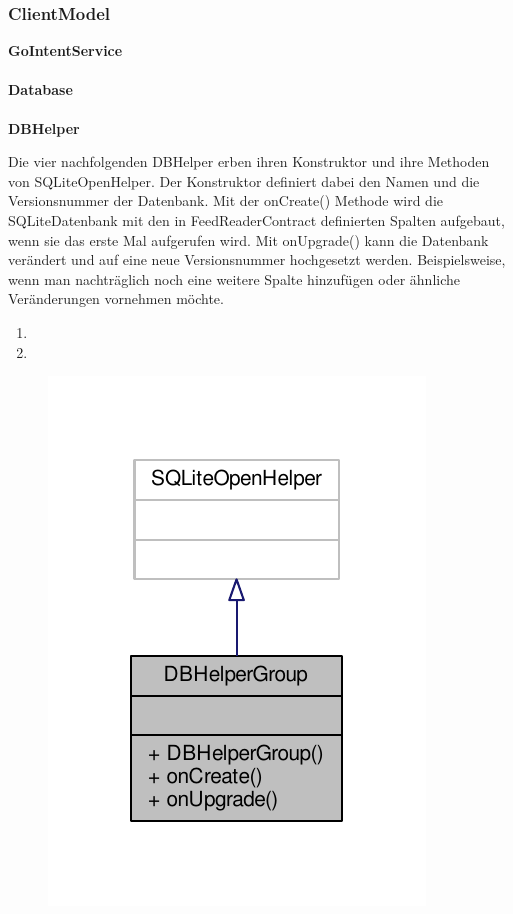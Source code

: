\subsubsection{ClientModel}

\textbf{GoIntentService}

\paragraph{Database}

\textbf{DBHelper}

Die vier nachfolgenden DBHelper erben ihren Konstruktor und ihre Methoden von SQLiteOpenHelper. Der Konstruktor definiert dabei den Namen und die Versionsnummer der Datenbank.
Mit der onCreate() Methode wird die SQLiteDatenbank mit den in FeedReaderContract definierten Spalten aufgebaut, wenn sie das erste Mal aufgerufen wird.
Mit onUpgrade() kann die Datenbank verändert und auf eine neue Versionsnummer hochgesetzt werden. Beispielsweise, wenn man nachträglich noch eine weitere Spalte hinzufügen oder ähnliche Veränderungen vornehmen möchte.
\begin{enumerate}
	\item
	\item
\end{enumerate}

\begin{figure}[H]
	\includegraphics[scale = 1]{res/umlClasses/d_b_helper_group__coll__graph.pdf}
	\centering	
\end{figure}

